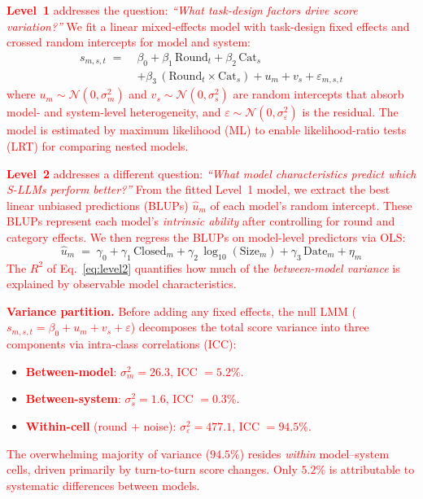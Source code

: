 \documentclass{ieeeaccess}
\newcommand{\updatedText}[1]{\textcolor{red}{#1}}
\newcommand{\noindentBold}[1]{\par\noindent\textbf{#1}}
\begin{document}
\updatedText{\textbf{Level~1} addresses the question:
\emph{``What task-design factors drive score variation?''}
We fit a linear mixed-effects model with task-design fixed effects and
crossed random intercepts for model and system:}
%
\begin{equation}\label{eq:level1}
\begin{split}
  s_{m,s,t} \;=\; & \beta_0
    + \beta_1\,\mathrm{Round}_t
    + \beta_2\,\mathrm{Cat}_s \\
    & + \beta_3\,(\mathrm{Round}_t \!\times\! \mathrm{Cat}_s)
    + u_m + v_s + \varepsilon_{m,s,t}
\end{split}
\end{equation}
%
\updatedText{where $u_m \sim \mathcal{N}(0,\sigma^2_m)$ and
$v_s \sim \mathcal{N}(0,\sigma^2_s)$ are random intercepts that absorb
model- and system-level heterogeneity, and
$\varepsilon \sim \mathcal{N}(0,\sigma^2_\varepsilon)$ is the residual.
The model is estimated by maximum likelihood (ML) to enable likelihood-ratio
tests (LRT) for comparing nested models.}

\updatedText{\textbf{Level~2} addresses a different question:
\emph{``What model characteristics predict which S-LLMs perform better?''}
From the fitted Level~1 model, we extract the best linear unbiased
predictions (BLUPs) $\hat{u}_m$ of each model's random intercept.
These BLUPs represent each model's \emph{intrinsic ability} after
controlling for round and category effects.
We then regress the BLUPs on model-level predictors via OLS:}
%
\begin{equation}\label{eq:level2}
  \hat{u}_m \;=\; \gamma_0
    + \gamma_1\,\mathrm{Closed}_m
    + \gamma_2\,\log_{10}(\mathrm{Size}_m)
    + \gamma_3\,\mathrm{Date}_m
    + \eta_m
\end{equation}
%
\updatedText{The $R^2$ of Eq.~\eqref{eq:level2} quantifies how much of the
\emph{between-model variance} is explained by observable model
characteristics.}

\medskip
\updatedText{\noindentBold{Variance partition.}
Before adding any fixed effects, the null LMM
($s_{m,s,t} = \beta_0 + u_m + v_s + \varepsilon$) decomposes the total
score variance into three components via intra-class correlations (ICC):}
\begin{itemize}
    \item \updatedText{\textbf{Between-model}: $\sigma^2_m = 26.3$, ICC $= 5.2\%$.}
    \item \updatedText{\textbf{Between-system}: $\sigma^2_s = 1.6$, ICC $= 0.3\%$.}
    \item \updatedText{\textbf{Within-cell} (round $+$ noise): $\sigma^2_\varepsilon = 477.1$, ICC $= 94.5\%$.}
\end{itemize}
\updatedText{The overwhelming majority of variance ($94.5\%$) resides \emph{within}
model--system cells, driven primarily by turn-to-turn score changes.
Only $5.2\%$ is attributable to systematic differences between models.}
\end{document}

